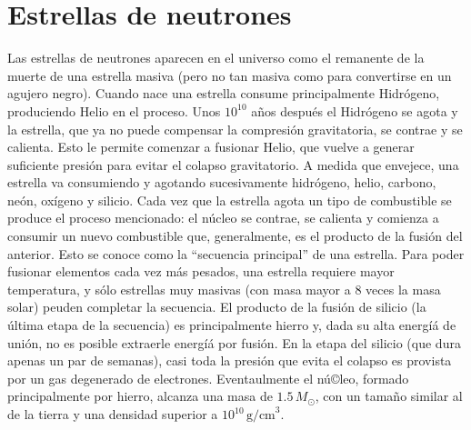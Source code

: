 \section{Estrellas de neutrones}\label{sc:intro}

Las estrellas de neutrones aparecen en el universo como el remanente de la muerte de una estrella masiva (pero no tan masiva como para convertirse en un agujero negro).
Cuando nace una estrella consume principalmente Hidrógeno, produciendo Helio en el proceso.
Unos $10^{10}$ años después el Hidrógeno se agota y la estrella, que ya no puede compensar la compresión gravitatoria, se contrae y se calienta.
Esto le permite comenzar a fusionar Helio, que vuelve a generar suficiente presión para evitar el colapso gravitatorio.
A medida que envejece, una estrella va consumiendo y agotando sucesivamente hidrógeno, helio, carbono, neón, oxígeno y silicio.
Cada vez que la estrella agota un tipo de combustible se produce el proceso mencionado: el núcleo se contrae, se calienta y comienza a consumir un nuevo combustible que, generalmente, es el producto de la fusión del anterior.
Esto se conoce como la ``secuencia principal'' de una estrella.
Para poder fusionar elementos cada vez más pesados, una estrella requiere mayor temperatura, y sólo estrellas muy masivas (con masa mayor a 8 veces la masa solar) peuden completar la secuencia.
El producto de la fusión de silicio (la última etapa de la secuencia) es principalmente hierro y, dada su alta energíá de unión, no es posible extraerle energíá por fusión.
En la etapa del silicio (que dura apenas un par de semanas), casi toda la presión que evita el colapso es provista por un gas degenerado de electrones.
Eventaulmente el nú©leo, formado principalmente por hierro, alcanza una masa de $1.5\,M_\odot$, con un tamaño similar al de la tierra y una densidad superior a $10^{10}\,\text{g/cm}^{3}$.

